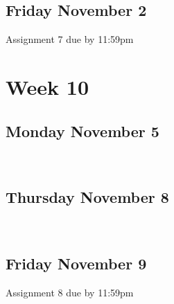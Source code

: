 \documentclass[]{book}
\let\originaltabular\tabular
\let\endoriginaltabular\endtabular
\renewenvironment{tabular}[1]{%
  \begingroup%
  \centering%
  \originaltabular{#1}}%
  {\endoriginaltabular\endgroup}
\theoremstyle{definition}
\theoremstyle{definition}
\theoremstyle{definition}
\theoremstyle{remark}
\begin{document}
\subsection{Friday November 2}\label{friday-november-2}

\begin{table}[H]
\centering
\begin{tabular}{l}
\hline
Assignment 7 due by 11:59pm\\
\hline
\end{tabular}
\end{table}

\section{Week 10}\label{week-10}

\subsection{Monday November 5}\label{monday-november-5}

\begin{table}[H]
\centering
\begin{tabular}{l}
\hline
\\
\hline
\end{tabular}
\end{table}

\subsection{Thursday November 8}\label{thursday-november-8}

\begin{table}[H]
\centering
\begin{tabular}{l}
\hline
\\
\hline
\end{tabular}
\end{table}

\subsection{Friday November 9}\label{friday-november-9}

\begin{table}[H]
\centering
\begin{tabular}{l}
\hline
Assignment 8 due by 11:59pm\\
\hline
\end{tabular}
\end{table}
\end{document}
